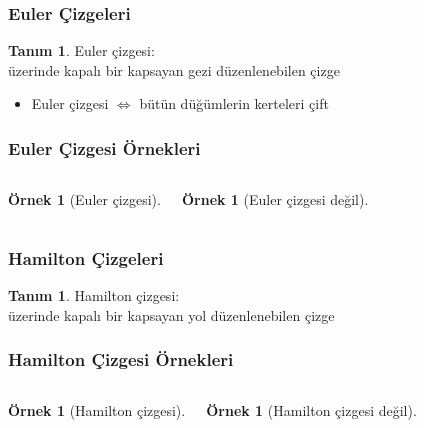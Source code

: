 \documentclass[dvipsnames]{beamer}
\theoremstyle{definition}
\newtheorem{tanim}[theorem]{Tanım}
\theoremstyle{example}
\newtheorem{ornek}[theorem]{Örnek}
\theoremstyle{plain}
\begin{document}
\begin{frame}
  \frametitle{Euler Çizgeleri}

  \begin{tanim}
    \alert{Euler çizgesi}:\\
      üzerinde kapalı bir kapsayan gezi düzenlenebilen çizge

    \pause
    \begin{itemize}
      \item Euler çizgesi $\Leftrightarrow$ bütün düğümlerin kerteleri çift
    \end{itemize}
  \end{tanim}
\end{frame}

\begin{frame}
  \frametitle{Euler Çizgesi Örnekleri}

  \begin{columns}
    \begin{ornek}[Euler çizgesi]
      \begin{center}
      \end{center}
    \end{ornek}

    \begin{ornek}[Euler çizgesi değil]
      \begin{center}
      \end{center}
    \end{ornek}
  \end{columns}
\end{frame}

\begin{frame}
  \frametitle{Hamilton Çizgeleri}

  \begin{tanim}
    \alert{Hamilton çizgesi}:\\
      üzerinde kapalı bir kapsayan yol düzenlenebilen çizge
  \end{tanim}
\end{frame}

\begin{frame}
  \frametitle{Hamilton Çizgesi Örnekleri}

  \begin{columns}
    \begin{ornek}[Hamilton çizgesi]
      \begin{center}
      \end{center}
    \end{ornek}

    \begin{ornek}[Hamilton çizgesi değil]
      \begin{center}
      \end{center}
    \end{ornek}
  \end{columns}
\end{frame}
\end{document}
